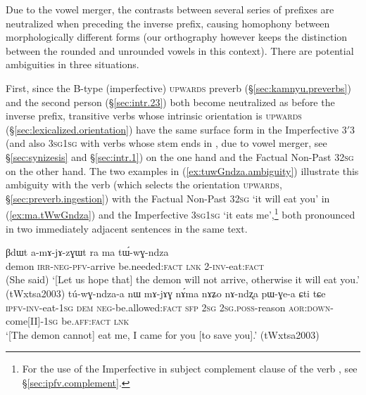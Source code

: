 Due to the vowel merger, the contrasts between several series of prefixes are neutralized when preceding the inverse prefix, causing homophony between morphologically different forms (our orthography however keeps the distinction between the rounded and unrounded vowels in this context). There are potential ambiguities in three situations.

First, since the B-type (imperfective) \textsc{upwards} preverb  (§\ref{sec:kamnyu.preverbs}) and the second person  (§\ref{sec:intr.23}) both become neutralized as  before the inverse prefix, transitive verbs whose intrinsic orientation is \textsc{upwards} (§\ref{sec:lexicalized.orientation}) have the same surface form in the Imperfective 3$'$\fl{}3 (and also \textsc{3sg}\fl{}\textsc{1sg} with verbs whose stem ends in , due to vowel merger, see §\ref{sec:synizesis} and §\ref{sec:intr.1}) on the one hand and the Factual Non-Past 3\fl{}\textsc{2sg} on the other hand. The two examples in (\ref{ex:tuwGndza.ambiguity}) illustrate this ambiguity with the verb  (which selects the orientation \textsc{upwards}, §\ref{sec:preverb.ingestion}) with the  Factual Non-Past 3\fl{}\textsc{2sg}  `it will eat you' in (\ref{ex:ma.tWwGndza}) and the Imperfective  \textsc{3sg}\fl{}\textsc{1sg} `it eats me',\footnote{For the use of the Imperfective in subject complement clause of the verb , see §\ref{sec:ipfv.complement}.} both pronounced  in two immediately adjacent sentences in the same text.

\begin{exe}
	\ex   \label{ex:tuwGndza.ambiguity}
	\begin{xlist}
		\ex   \label{ex:ma.tWwGndza}
		\gll βdɯt a-mɤ-jɤ-zɣɯt ra ma tɯ́-wɣ-ndza  \\
		demon \textsc{irr}-\textsc{neg}-\textsc{pfv}-arrive be.needed:\textsc{fact} \textsc{lnk} 2-\textsc{inv}-eat:\textsc{fact}  \\
		\glt (She said) `[Let us hope that] the demon will not arrive, otherwise it will eat you.' (tWxtsa2003)
		\ex   \label{ex:tuwGndzaa.mAjAG}
		\gll tú-wɣ-ndza-a nɯ mɤ-jɤɣ nɤ́ma nɤʑo nɤ-ndʐa pɯ-ɣe-a ɕti tɕe \\ 
		\textsc{ipfv}-\textsc{inv}-eat-\textsc{1sg} \textsc{dem} \textsc{neg}-be.allowed:\textsc{fact} \textsc{sfp} \textsc{2sg} \textsc{2sg}.\textsc{poss}-reason \textsc{aor}:\textsc{down}-come[II]-\textsc{1sg} be.\textsc{aff}:\textsc{fact} \textsc{lnk} \\
		\glt `[The demon cannot] eat me, I came for you [to save you].' (tWxtsa2003)
	\end{xlist}
\end{exe}

